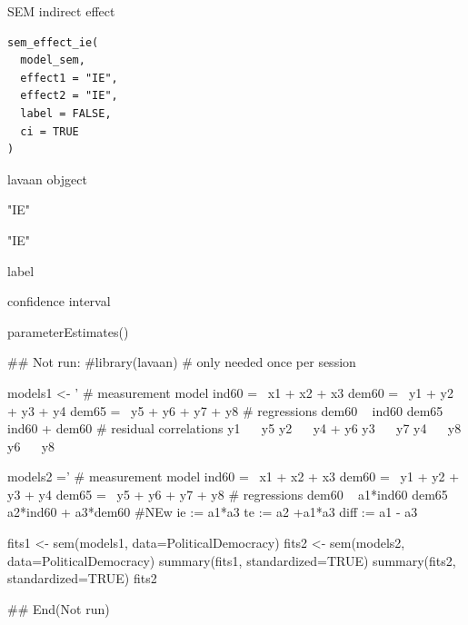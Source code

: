 \documentclass[a4paper]{book}
\begin{document}
%
\begin{Description}
SEM indirect effect
\end{Description}
%
\begin{Usage}
\begin{verbatim}
sem_effect_ie(
  model_sem,
  effect1 = "IE",
  effect2 = "IE",
  label = FALSE,
  ci = TRUE
)
\end{verbatim}
\end{Usage}
%
\begin{Arguments}
\begin{ldescription}
\item[\code{model\_sem}] lavaan objgect

\item[\code{effect1}] "IE"

\item[\code{effect2}] "IE"

\item[\code{label}] label

\item[\code{ci}] confidence interval
\end{ldescription}
\end{Arguments}
%
\begin{Value}
parameterEstimates()
\end{Value}
%
\begin{Examples}
\begin{ExampleCode}

## Not run: 
#library(lavaan) # only needed once per session

models1 <- '
  # measurement model
    ind60 =~ x1 + x2 + x3
    dem60 =~ y1 + y2 + y3 + y4
    dem65 =~ y5 + y6 + y7 + y8
    # regressions
    dem60 ~ ind60
    dem65 ~ ind60 + dem60
      # residual correlations
    y1 ~~ y5
    y2 ~~ y4 + y6
    y3 ~~ y7
    y4 ~~ y8
    y6 ~~ y8

models2 ='
  # measurement model
    ind60 =~ x1 + x2 + x3
    dem60 =~ y1 + y2 + y3 + y4
    dem65 =~ y5 + y6 + y7 + y8
     # regressions
    dem60 ~ a1*ind60
    dem65 ~ a2*ind60 + a3*dem60
 #NEw
   ie := a1*a3
   te := a2 +a1*a3
   diff := a1 - a3




fits1 <- sem(models1, data=PoliticalDemocracy)
fits2 <- sem(models2, data=PoliticalDemocracy)
summary(fits1, standardized=TRUE)
summary(fits2, standardized=TRUE)
fits2 %

## End(Not run)

\end{ExampleCode}
\end{Examples}
\end{document}
